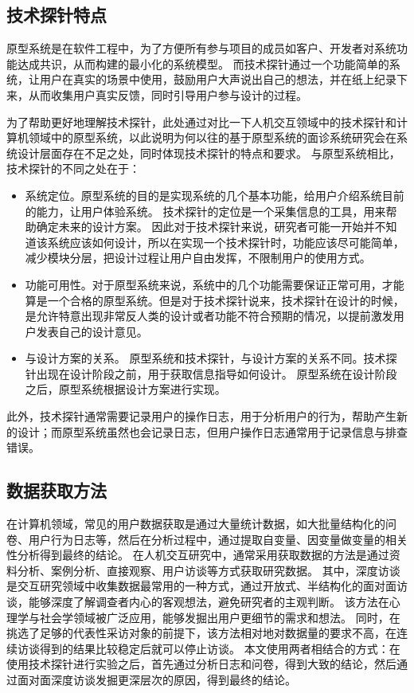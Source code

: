 \subsection{技术探针特点}

原型系统是在软件工程中，为了方便所有参与项目的成员如客户、开发者对系统功能达成共识，从而构建的最小化的系统模型。
而技术探针通过一个功能简单的系统，让用户在真实的场景中使用，鼓励用户大声说出自己的想法，并在纸上纪录下来，从而收集用户真实反馈，同时引导用户参与设计的过程。

为了帮助更好地理解技术探针，此处通过对比一下人机交互领域中的技术探针和计算机领域中的原型系统，以此说明为何以往的基于原型系统的面诊系统研究会在系统设计层面存在不足之处，同时体现技术探针的特点和要求。
与原型系统相比，技术探针的不同之处在于：
\begin{itemize}
    \item 系统定位。原型系统的目的是实现系统的几个基本功能，给用户介绍系统目前的能力，让用户体验系统。
    技术探针的定位是一个采集信息的工具，用来帮助确定未来的设计方案。
    因此对于技术探针来说，研究者可能一开始并不知道该系统应该如何设计，所以在实现一个技术探针时，功能应该尽可能简单，减少模块分层，把设计过程让用户自由发挥，不限制用户的使用方式。
    \item 功能可用性。对于原型系统来说，系统中的几个功能需要保证正常可用，才能算是一个合格的原型系统。但是对于技术探针说来，技术探针在设计的时候，是允许特意出现非常反人类的设计或者功能不符合预期的情况，以提前激发用户发表自己的设计意见。
    \item 与设计方案的关系。
    原型系统和技术探针，与设计方案的关系不同。技术探针出现在设计阶段之前，用于获取信息指导如何设计。
    原型系统在设计阶段之后，原型系统根据设计方案进行实现。
\end{itemize}

此外，技术探针通常需要记录用户的操作日志，用于分析用户的行为，帮助产生新的设计；而原型系统虽然也会记录日志，但用户操作日志通常用于记录信息与排查错误。

\subsection{数据获取方法}
在计算机领域，常见的用户数据获取是通过大量统计数据，如大批量结构化的问卷、用户行为日志等，然后在分析过程中，通过提取自变量、因变量做变量的相关性分析得到最终的结论。
在人机交互研究中，通常采用获取数据的方法是通过资料分析、案例分析、直接观察、用户访谈等方式获取研究数据。
其中，深度访谈是交互研究领域中收集数据最常用的一种方式，通过开放式、半结构化的面对面访谈，能够深度了解调查者内心的客观想法，避免研究者的主观判断。
该方法在心理学与社会学领域被广泛应用，能够发掘出用户更细节的需求和想法。
同时，在挑选了足够的代表性采访对象的前提下，该方法相对地对数据量的要求不高，在连续访谈得到的结果比较稳定后就可以停止访谈\cite{cleary2014data}。
本文使用两者相结合的方式：在使用技术探针进行实验之后，首先通过分析日志和问卷，得到大致的结论，然后通过面对面深度访谈发掘更深层次的原因，得到最终的结论。

